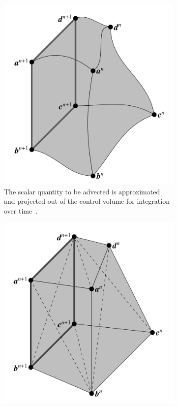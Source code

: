 \begin{figure}[htbp]
	\centering
	\begin{subfigure}{.45\textwidth}
		\centering
		\includegraphics[width=1.0\linewidth]{figs/streaktube.png}
		\caption{The scalar quantity to be advected is approximated and projected out of the control volume for integration over time~\cite{Owkes2014}. }
		\label{fig:streak}
	\end{subfigure}%
\hfill
	\begin{subfigure}{0.45\textwidth}
		\centering
		\includegraphics[width=1.0\linewidth]{figs/simplicies}

\end{subfigure}
\end{figure}
